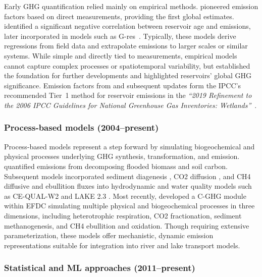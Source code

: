 \documentclass[10pt]{article}
\begin{document}
Early \ac{GHG} quantification relied mainly on empirical methods. 
\citet{Louis2000} pioneered emission factors based on direct measurements, providing the first global estimates. 
\citet{Barros2011} identified a significant negative correlation between reservoir age and emissions, later incorporated in models such as G-res~\cite{Prairie2017b, Prairie2021}. 
Typically, these models derive regressions from field data and extrapolate emissions to larger scales or similar systems. 
While simple and directly tied to measurements, empirical models cannot capture complex processes or spatiotemporal variability, but established the foundation for further developments and highlighted reservoirs’ global \ac{GHG} significance. 
Emission factors from \citet{Louis2000} and subsequent updates form the IPCC's recommended Tier~1 method for reservoir emissions in the \emph{``2019 Refinement to the 2006 \acs{IPCC} Guidelines for National Greenhouse Gas Inventories: Wetlands''}~\cite{IPCC2019}.

\subsubsection{Process-based models (2004--present)}
\label{sec:process_models}

Process-based models represent a step forward by simulating biogeochemical and physical processes underlying \ac{GHG} synthesis, transformation, and emission. 
\citet{Tremblay2004} quantified emissions from decomposing flooded biomass and soil carbon. 
Subsequent models incorporated sediment diagenesis \cite{Berger2014}, \ac{CO2} diffusion \cite{Wu2022}, and \ac{CH4} diffusive and ebullition fluxes \citep{Lomov2024} into hydrodynamic and water quality models such as CE-QUAL-W2 \citep{Berger2014, Wu2022} and LAKE 2.3 \citep{Lomov2024}. 
Most recently, \citet{SHI2025} developed a C-GHG module within \ac{EFDC} \cite{hamrick1992} simulating multiple physical and biogeochemical processes in three dimensions, including heterotrophic respiration, \ac{CO2} fractionation, sediment methanogenesis, and \ac{CH4} ebullition and oxidation. 
Though requiring extensive parameterization, these models offer mechanistic, dynamic emission representations suitable for integration into river and lake transport models.

\subsubsection{Statistical and \ac{ML} approaches (2011--present)}
\end{document}
